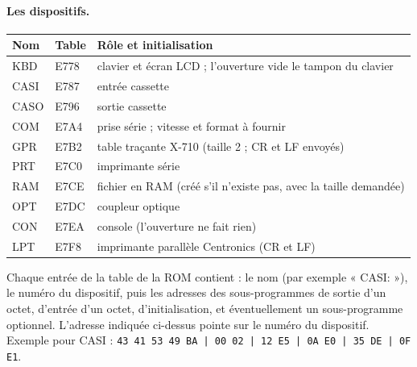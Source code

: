 \documentclass[a4paper,10pt]{article}
\begin{document}
\paragraph{Les dispositifs.}
\begin{center}\small
\begin{tabular}{@{}l>{\ttfamily}l>{\raggedright\arraybackslash}p{10cm}@{}}
\toprule
Nom & \normalfont Table & Rôle et initialisation \\
\midrule
KBD & E778 & clavier et écran LCD ; l'ouverture vide le tampon du clavier \\
CASI & E787 & entrée cassette \\
CASO & E796 & sortie cassette \\
COM & E7A4 & prise série ; vitesse et format à fournir \\
GPR & E7B2 & table traçante X-710 (taille 2 ; CR et LF envoyés) \\
PRT & E7C0 & imprimante série \\
RAM & E7CE & fichier en RAM (créé s'il n'existe pas, avec la taille demandée) \\
OPT & E7DC & coupleur optique \\
CON & E7EA & console (l'ouverture ne fait rien) \\
LPT & E7F8 & imprimante parallèle Centronics (CR et LF) \\
\bottomrule
\end{tabular}
\end{center}

Chaque entrée de la table de la ROM contient : le nom (par exemple
« CASI: »), le numéro du dispositif, puis les adresses des sous-programmes
de sortie d'un octet, d'entrée d'un octet, d'initialisation, et
éventuellement un sous-programme optionnel. L'adresse indiquée ci-dessus
pointe sur le numéro du dispositif. Exemple pour CASI :
\texttt{43 41 53 49 BA | 00 02 | 12 E5 | 0A E0 | 35 DE | 0F E1}.
\end{document}
